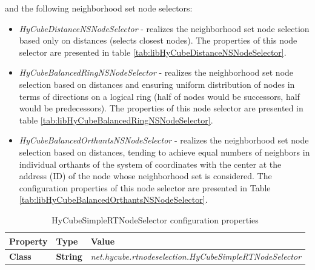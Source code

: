 \noindent
and the following neighborhood set node selectors:

\begin{itemize}
	\renewcommand{\labelitemi}{$\bullet$}
	\item \emph{HyCubeDistanceNSNodeSelector} - realizes the neighborhood set node selection based only on distances (selects closest nodes). The properties of this node selector are presented in table \ref{tab:libHyCubeDistanceNSNodeSelector}.
	\item \emph{HyCubeBalancedRingNSNodeSelector} - realizes the neighborhood set node selection based on distances and ensuring uniform distribution of nodes in terms of directions on a logical ring (half of nodes would be successors, half would be predecessors). The properties of this node selector are presented in table \ref{tab:libHyCubeBalancedRingNSNodeSelector}.
	\item \emph{HyCubeBalancedOrthantsNSNodeSelector} - realizes the neighborhood set node selection based on distances, tending to achieve equal numbers of neighbors in individual orthants of the system of coordinates with the center at the address (ID) of the node whose neighborhood set is considered. The configuration properties of this node selector are presented in Table \ref{tab:libHyCubeBalancedOrthantsNSNodeSelector}.
\end{itemize}





		
		
\begin{table}
\scriptsize
\begin{center}
\begin{tabular}{p{3cm} p{3cm} p{8.5cm}}
	\hline
	\textbf{Property}						& \textbf{Type}					& \textbf{Value}					\\[1mm]
    \hline
	\textbf{Class}							& \textbf{String}				& \textit{net.hycube.rtnodeselection.HyCubeSimpleRTNodeSelector}			\\[1.5mm]
    \hline
\end{tabular}
\end{center}
\caption{HyCubeSimpleRTNodeSelector configuration properties}
\label{tab:libHyCubeSimpleRTNodeSelector}
\end{table}

